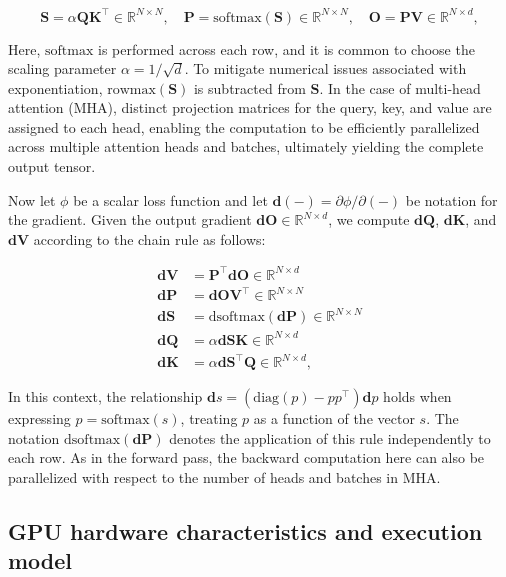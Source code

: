 \begin{equation*}
  \mathbf{S} = \alpha \mathbf{Q} \mathbf{K}^\top \in \mathbb{R}^{N \times N}, \quad \mathbf{P} = \mathrm{softmax}(\mathbf{S}) \in \mathbb{R}^{N \times N}, \quad \mathbf{O} = \mathbf{P}\mathbf{V} \in \mathbb{R}^{N \times d},
\end{equation*}

Here, $\mathrm{softmax}$ is performed across each row, and it is common to choose the scaling parameter $\alpha = 1/\sqrt{d}$. To mitigate numerical issues associated with exponentiation, $\mathrm{rowmax}(\mathbf{S})$ is subtracted from $\mathbf{S}$. In the case of multi-head attention (MHA), distinct projection matrices for the query, key, and value are assigned to each head, enabling the computation to be efficiently parallelized across multiple attention heads and batches, ultimately yielding the complete output tensor.

Now let $\phi$ be a scalar loss function and let $\mathbf{d}(-) = \partial \phi / \partial (-)$ be notation for the gradient. Given the output gradient $\mathbf{dO} \in \mathbb{R}^{N \times d}$, we compute $\mathbf{dQ}$, $\mathbf{dK}$, and $\mathbf{dV}$ according to the chain rule as follows:

\begin{align*}
  \mathbf{dV} &= \mathbf{P}^\top \mathbf{dO} \in \mathbb{R}^{N \times d} \\
  \mathbf{dP} &= \mathbf{dO} \mathbf{V}^\top \in \mathbb{R}^{N \times N} \\
  \mathbf{dS} &= \mathrm{dsoftmax} (\mathbf{dP}) \in \mathbb{R}^{N \times N} \\
  \mathbf{dQ} &= \alpha \mathbf{dS} \mathbf{K} \in \mathbb{R}^{N \times d} \\
  \mathbf{dK} &= \alpha \mathbf{dS}^\top \mathbf{Q} \in \mathbb{R}^{N \times d},
\end{align*}

In this context, the relationship $\mathbf{d}s = (\mathrm{diag}(p) - p p^\top)\mathbf{d}p$ holds when expressing $p = \mathrm{softmax}(s)$, treating $p$ as a function of the vector $s$. The notation $\mathrm{dsoftmax}(\mathbf{dP})$ denotes the application of this rule independently to each row. As in the forward pass, the backward computation here can also be parallelized with respect to the number of heads and batches in MHA.

\subsection{GPU hardware characteristics and execution model}
\label{subsec:hardware}

